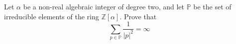Let $ \alpha $ be a non-real algebraic integer of degree two, and let $ \mathbb{P} $ be the set of irreducible elements of the ring $ \mathbb{Z}[ \alpha] $. Prove that
\[ \sum_{p\in \mathbb{P}}^{{}}\frac{1}{|p|^{2}}=\infty \]